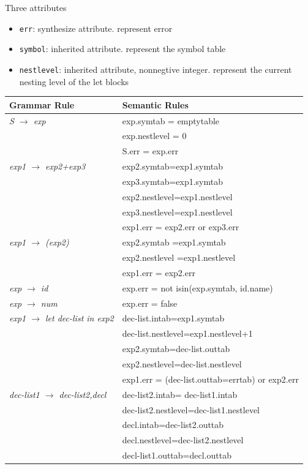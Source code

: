 \documentclass[11pt]{article}
\begin{document}
Three attributes
\begin{itemize}
\item \texttt{err}: synthesize attribute. represent error
\item \texttt{symbol}: inherited attribute. represent the symbol table
\item \texttt{nestlevel}: inherited attribute, nonnegtive integer. represent the current
nesting level of the let blocks
\end{itemize}
\ttfamily
\begin{center}
\begin{tabular}{ll}
Grammar Rule & Semantic Rules\\
\hline
\emph{S \(\to\) exp} & exp.symtab = emptytable\\
 & exp.nestlevel = 0\\
 & S.err = exp.err\\
\hline
\emph{exp1 \(\to\) exp2+exp3} & exp2.symtab=exp1.symtab\\
 & exp3.symtab=exp1.symtab\\
 & exp2.nestlevel=exp1.nestlevel\\
 & exp3.nestlevel=exp1.nestlevel\\
 & exp1.err = exp2.err or exp3.err\\
\hline
\emph{exp1 \(\to\) (exp2)} & exp2.symtab =exp1.symtab\\
 & exp2.nestlevel =exp1.nestlevel\\
 & exp1.err = exp2.err\\
\hline
\emph{exp \(\to\) id} & exp.err = not isin(exp.symtab, id.name)\\
\hline
\emph{exp \(\to\) num} & exp.err = false\\
\hline
\emph{exp1 \(\to\) let dec-list in exp2} & dec-list.intab=exp1.symtab\\
 & dec-list.nestlevel=exp1.nestlevel+1\\
 & exp2.symtab=dec-list.outtab\\
 & exp2.nestlevel=dec-list.nestlevel\\
 & exp1.err = (dec-list.outtab=errtab) or exp2.err\\
\hline
\emph{dec-list1 \(\to\) dec-list2,decl} & dec-list2.intab= dec-list1.intab\\
 & dec-list2.nestlevel=dec-list1.nestlevel\\
 & decl.intab=dec-list2.outtab\\
 & decl.nestlevel=dec-list2.nestlevel\\
 & decl-list1.outtab=decl.outtab\\

\end{tabular}
\end{center}
\end{document}
